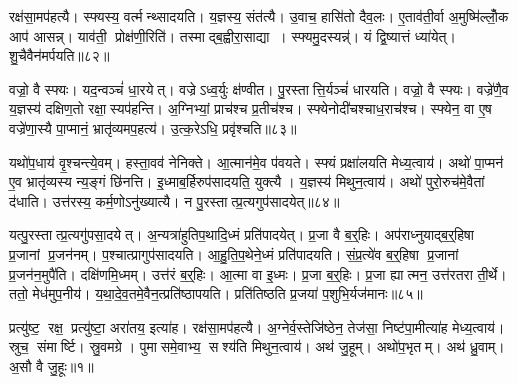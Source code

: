रक्ष॑सा॒मप॑हत्यै। स्फ्यस्य॒ वर्त्मन्थ्सादयति। य॒ज्ञस्य॒ संत॑त्यै। उ॒वाच॒ हासि॑तो दैव॒लः। ए॒ताव॑ती॒र्वा अ॒मुष्मि॑ल्लोँ॒क आप॑ आसन्न्। याव॑ती॒ प्रोक्ष॑णी॒रिति॑। तस्माद्ब॒ह्वीरा॒साद्या। स्फ्यमु॒दस्यन्न्॑। यं द्वि॒ष्यात्तं ध्या॑येत्। शु॒चैवैन॑मर्पयति॥८२॥

वज्रो॒ वै स्फ्यः। यद॒न्वञ्चं॑ धा॒रयेत्। वज्रेऽध्व॒र्युः क्ष॑ण्वीत। पु॒रस्तात्ति॒र्यञ्चं॑ धारयति। वज्रो॒ वै स्फ्यः। वज्रे॑णै॒व य॒ज्ञस्य॑ दक्षिण॒तो रक्षा॒स्यप॑हन्ति। अ॒ग्निभ्यां॒ प्राच॑श्च प्र॒तीच॑श्च। स्फ्येनोदी॑चश्चाध॒राच॑श्च। स्फ्येन॒ वा ए॒ष वज्रे॑णा॒स्यै पा॒प्मानं॒ भ्रातृ॑व्यमप॒हत्य॑। उ॒त्क॒रेऽधि॒ प्रवृ॑श्चति॥८३॥

यथो॑प॒धाय॑ वृ॒श्चन्त्ये॒वम्। हस्ता॒वव॑ नेनिक्ते। आ॒त्मान॑मे॒व प॑वयते। स्फ्यं प्रक्षा॑लयति मेध्य॒त्वाय॑। अथो॑ पा॒प्मन॑ ए॒व भ्रातृ॑व्यस्य न्य॒ङ्गं छि॑नत्ति। इ॒ध्माब॒र्\mbox{}हिरुप॑सादयति॒ युक्त्यै। य॒ज्ञस्य॑ मिथुन॒त्वाय॑। अथो॑ पुरो॒रुच॑मे॒वैतां द॑धाति। उत्त॑रस्य॒ कर्म॒णोऽनु॑ख्यात्यै। न पु॒रस्तात्प्र॒त्यगुप॑सादयेत्॥८४॥

यत्पु॒रस्तात्प्र॒त्यगु॑पसा॒दयेत्। अ॒न्यत्रा॑हुतिप॒थादि॒ध्मं प्रति॑पादयेत्। प्र॒जा वै ब॒र्॒हिः। अप॑राध्नुयाद्ब॒र्॒हिषा प्र॒जानां प्र॒जन॑नम्। प॒श्चात्प्रागुप॑सादयति। आ॒हु॒ति॒प॒थेने॒ध्मं प्रति॑पादयति। सं॒प्र॒त्ये॑व ब॒र्॒हिषा प्र॒जानां प्र॒जन॑न॒मुपै॑ति। दक्षि॑णमि॒ध्मम्। उत्त॑रं ब॒र्॒हिः। आ॒त्मा वा इ॒ध्मः। प्र॒जा ब॒र्॒हिः। प्र॒जा ह्यात्मन॒ उत्त॑रतरा ती॒र्थे। ततो॒ मेध॑मुप॒नीय॑। य॒था॒दे॒व॒तमे॒वैन॒त्प्रति॑ष्ठापयति। प्रति॑तिष्ठति प्र॒जया॑ प॒शुभि॒र्यज॑मानः॥८५॥



\clearpage
{}
\setcounter{anuvakam}{0}
प्रत्यु॑ष्ट॒ रक्ष॒ प्रत्यु॑ष्टा॒ अरा॑तय॒ इत्या॑ह। रक्ष॑सा॒मप॑हत्यै। अ॒ग्नेर्व॒स्तेजि॑ष्ठेन॒ तेज॑सा॒ निष्ट॑पा॒मीत्या॑ह मेध्य॒त्वाय॑। स्रुच॒ संमार्ष्टि। स्रु॒वमग्रे। पुमासमे॒वाभ्य॒ सश्य॑ति मिथुन॒त्वाय॑। अथ॑ जु॒हूम्। अथो॑प॒भृतम्। अथ॑ ध्रु॒वाम्। अ॒सौ वै जु॒हूः॥१॥

